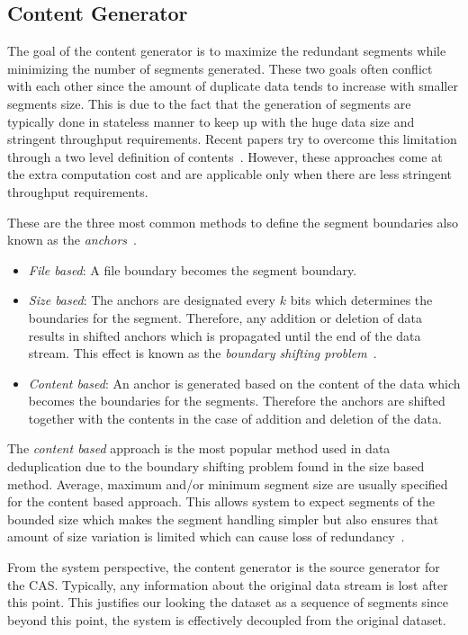 \subsection{Content Generator}
The goal of the content generator is to maximize the redundant segments while minimizing the number of segments generated.
These two goals often conflict with each other since the amount of duplicate data tends to increase with smaller segments size.
This is due to the fact that the generation of segments are typically done in stateless manner to keep up with the huge data size and stringent throughput requirements.
Recent papers try to overcome this limitation through a two level definition of contents~\cite{kruus:2010, bobbarjung:2006}.
However, these approaches come at the extra computation cost and are applicable only when there are less stringent throughput requirements.

These are the three most common methods to define the segment boundaries also known as the \emph{anchors}~\cite{zhu:2008, muthitacharoen:2001}.
\begin{itemize}
  \item \emph{File based}: A file boundary becomes the segment boundary.
  \item \emph{Size based}: The anchors are designated every $k$ bits which determines the boundaries for the segment. Therefore, any addition or deletion of data results in shifted anchors which is propagated until the end of the data stream. This effect is known as the \emph{boundary shifting problem}~\cite{muthitacharoen:2001}.
  \item \emph{Content based}: An anchor is generated based on the content of the data which becomes the boundaries for the segments. Therefore the anchors are shifted together with the contents in the case of addition and deletion of the data.
\end{itemize}

The \emph{content based} approach is the most popular method used in data deduplication due to the boundary shifting problem found in the size based method.
Average, maximum and/or minimum segment size are usually specified for the content based approach. This allows system to expect segments of the bounded size which makes the segment handling simpler but also ensures that amount of size variation is limited which can cause loss of redundancy~\cite{eshghi:2005}.

From the system perspective, the content generator is the source generator for the CAS. Typically, any information about the original data stream is lost after this point. This justifies our looking the dataset as a sequence of segments since beyond this point, the system is effectively decoupled from the original dataset.

